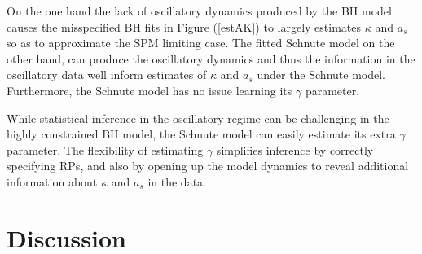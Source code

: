 %
On the one hand the lack of oscillatory dynamics produced by the BH model causes the misspecified
BH fits in Figure (\ref{estAK}) to largely estimates $\kappa$ and $a_s$ so as to
approximate the SPM limiting case. The fitted Schnute model on the other hand, can 
produce the oscillatory dynamics and thus the information in the oscillatory data
well inform estimates of $\kappa$ and $a_s$ under the Schnute model. Furthermore,
the Schnute model has no issue learning its $\gamma$ parameter.

%
While statistical inference in the oscillatory regime can be challenging in
the highly constrained BH model, the Schnute model can easily estimate its extra
$\gamma$ parameter. The flexibility of estimating $\gamma$ simplifies inference by 
correctly specifying RPs, and also by opening up the model dynamics to reveal
additional information about $\kappa$ and $a_s$ in the data. %



\section{Discussion}


